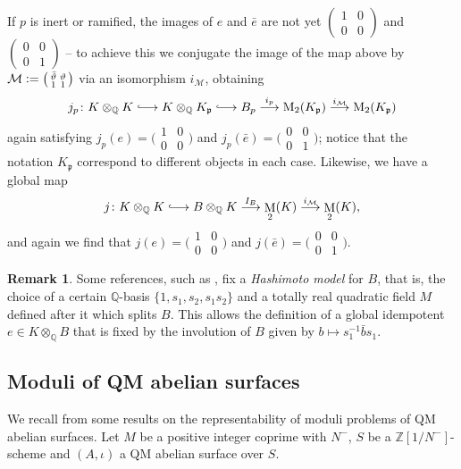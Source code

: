 \documentclass[a4paper]{amsart}
\numberwithin{equation}{section}
\theoremstyle{definition}
\newtheorem{remark}[theorem]{Remark}
\newcommand{\Q}{\mathbb{Q}}
\newcommand{\Z}{\mathbb{Z}}
\newcommand{\defeq}{\vcentcolon=}
\DeclareMathOperator{\M}{M}
\newcommand{\longmono}{\mbox{\;$\lhook\joinrel\longrightarrow$\;}}
\begin{document}
If $p$ is inert or ramified, the images of $e$ and $\bar{e}$ are not yet $\left(\begin{smallmatrix}1 & 0 \\ 0 & 0\end{smallmatrix}\right)$ and $\left(\begin{smallmatrix}0 & 0 \\ 0 & 1\end{smallmatrix}\right)$ -- to achieve this we conjugate the image of the map above by $\mathcal{M}\defeq\left(\begin{smallmatrix}\bar{\vartheta} & \vartheta \\ 1 & 1\end{smallmatrix}\right)$ via an isomorphism $i_\mathcal{M}$, obtaining \[j_p\colon K\otimes_{\Q}K\longmono K\otimes_{\Q} K_\mathfrak{p}\longmono B_p\stackrel{i_p}{\longrightarrow}\mathrm{M}_2(K_\mathfrak{p})\stackrel{i_\mathcal{M}}{\longrightarrow}\mathrm{M}_2(K_\mathfrak{p})\]
again satisfying $j_p(e)=\big(\begin{smallmatrix}1 & 0 \\ 0 & 0\end{smallmatrix}\big)$ and $j_p(\bar{e})=\big(\begin{smallmatrix}0 & 0 \\ 0 & 1\end{smallmatrix}\big)$; notice that the notation $K_\mathfrak{p}$ correspond to different objects in each case. Likewise, we have a global map \[j\colon K\otimes_\Q K \longmono B\otimes_\Q K\stackrel{I_B}{\longrightarrow} \M_2(K)\stackrel{i_\mathcal{M}}{\longrightarrow} \M_2(K),\] and again we find that $j(e)=\big(\begin{smallmatrix}1 & 0 \\ 0 & 0\end{smallmatrix}\big)$ and $j(\bar{e})=\big(\begin{smallmatrix}0 & 0 \\ 0 & 1\end{smallmatrix}\big)$.
\begin{remark}
Some references, such as \cite{Brooks}, fix a \textit{Hashimoto model} for $B$, that is, the choice of a certain $\Q$-basis $\{1,s_1,s_2,s_1s_2\}$ and a totally real quadratic field $M$ defined after it which splits $B$. This allows the definition of a global idempotent $e\in K\otimes_{\Q} B$ that is fixed by the involution of $B$ given by $b\mapsto s_1^{-1}\bar{b} s_1$.
\end{remark}

\subsection{Moduli of QM abelian surfaces}\label{subsec.Moduli}
We recall from \cite[\S1--4]{Buzzard} some results on the representability of moduli problems of QM abelian surfaces. Let $M$ be a positive integer coprime with $N^-$, $S$ be a $\Z[1/N^-]$-scheme and $(A,\iota)$ a QM abelian surface over $S$.
\end{document}
